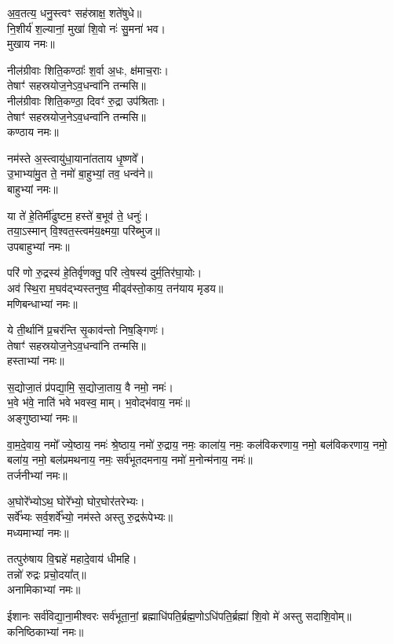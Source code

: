 अ॒व॒तत्य॒ धनु॒स्त्वꣳ सह॑स्राक्ष॒ शते॑षुधे॥\\
नि॒शीर्य॑ श॒ल्यानां॒ मुखा॑ शि॒वो नः॑ सु॒मना॑ भव।\\
मुखाय नमः॥

नील॑ग्रीवाः शिति॒कण्ठाः᳚ श॒र्वा अ॒धः, क्ष॑माच॒राः।\\
तेषाꣳ॑ सहस्रयोज॒नेऽव॒धन्वा॑नि तन्मसि॥\\
नील॑ग्रीवाः शिति॒कण्ठा॒ दिवꣳ॑ रु॒द्रा उप॑श्रिताः।\\
तेषाꣳ॑ सहस्रयोज॒नेऽव॒धन्वा॑नि तन्मसि॥\\
कण्ठाय नमः॥

नम॑स्ते अ॒स्त्वायु॑धा॒याना॑तताय धृ॒ष्णवे᳚।\\
उ॒भाभ्या॑मु॒त ते॒ नमो॑ बा॒हुभ्यां॒ तव॒ धन्व॑ने॥\\
बाहुभ्यां नमः॥

या ते॑ हे॒तिर्मी॑ढुष्टम॒ हस्ते॑ ब॒भूव॑ ते॒ धनुः॑।\\
तया॒ऽस्मान् वि॒श्वत॒स्त्वम॑य॒क्ष्मया॒ परि॑ब्भुज॥\\
उपबाहुभ्यां नमः॥

परि॑ णो रु॒द्रस्य॑ हे॒तिर्वृ॑णक्तु॒ परि॑ त्वे॒षस्य॑ दुर्म॒तिर॑घा॒योः।\\
अव॑ स्थि॒रा म॒घव॑द्भ्यस्तनुष्व॒ मीढ्व॑स्तो॒काय॒ तन॑याय मृडय॥\\
मणिबन्धाभ्यां नमः॥

ये ती॒र्थानि॑ प्र॒चर॑न्ति सृ॒काव॑न्तो निष॒ङ्गिणः॑।\\
तेषाꣳ॑ सहस्रयोज॒नेऽव॒धन्वा॑नि तन्मसि॥\\
हस्ताभ्यां नमः॥

स॒द्योजा॒तं प्र॑पद्या॒मि॒ स॒द्योजा॒ताय॒ वै नमो॒ नमः॑।\\
भ॒वे भ॑वे॒ नाति॑ भवे भवस्व॒ माम्। भ॒वोद्भ॑वाय॒ नमः॑॥\\
अङ्गुष्ठाभ्यां नमः॥

वा॒म॒दे॒वाय॒ नमो᳚ ज्ये॒ष्ठाय॒ नमः॑ श्रे॒ष्ठाय॒ नमो॑ रु॒द्राय॒ नमः॒ काला॑य॒ नमः॒ कल॑विकरणाय॒ नमो॒ बल॑विकरणाय॒ नमो॒ बला॑य॒ नमो॒ बल॑प्रमथनाय॒ नमः॒ सर्व॑भूतदमनाय॒ नमो॑ म॒नोन्म॑नाय॒ नमः॑॥\\
तर्जनीभ्यां नमः॥

अ॒घोरे᳚भ्योऽथ॒ घोरे᳚भ्यो॒ घोर॒घोर॑तरेभ्यः।\\
सर्वे᳚भ्यः सर्व॒शर्वे᳚भ्यो॒ नम॑स्ते अस्तु रु॒द्ररू॑पेभ्यः॥\\
मध्यमाभ्यां नमः॥

तत्पुरु॑षाय वि॒द्महे॑ महादे॒वाय॑ धीमहि।\\
तन्नो॑ रुद्रः प्रचो॒दया᳚त्॥\\
अनामिकाभ्यां नमः॥

ईशानः सर्व॑विद्या॒ना॒मीश्वरः सर्व॑भूता॒नां॒ ब्रह्माधि॑पति॒र्ब्रह्म॒णो\-ऽधि॑पति॒र्ब्रह्मा॑ शि॒वो मे॑ अस्तु सदाशि॒वोम्॥\\
कनिष्ठिकाभ्यां नमः॥

